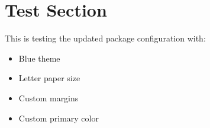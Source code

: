 \documentclass[letter]{cv_espresso_deedy_1col}
\begin{document}
\cvlastupdated


\cvlongrule

\section{Test Section}
This is testing the updated package configuration with:
\begin{itemize}
    \item Blue theme
    \item Letter paper size  
    \item Custom margins
    \item Custom primary color
\end{itemize}

\end{document}
